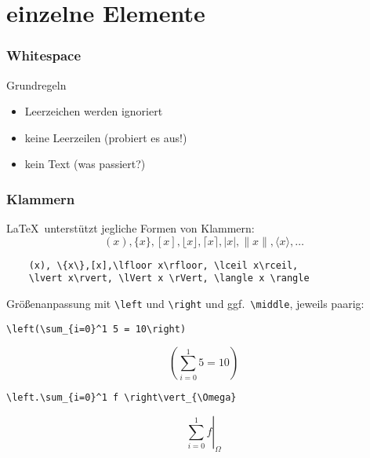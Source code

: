 \section{einzelne Elemente}

\begin{frame}[fragile]
  \frametitle {Whitespace}
  \begin{block}{Grundregeln}
    \begin{itemize}
      \item Leerzeichen werden ignoriert
      \item keine Leerzeilen (probiert es aus!)
      \item kein Text (was passiert?)
    \end{itemize}
  \end{block}
\end{frame}
% 

\begin{frame}[fragile]
  \frametitle{Klammern}

  \onslide<+->

  \LaTeX\ unterstützt jegliche Formen von Klammern:
  \begin{equation*}
    (x), \{x\},[x],\lfloor x\rfloor, \lceil x\rceil,\lvert x\rvert, \lVert x \rVert, \langle x \rangle, \ldots
  \end{equation*}

  \onslide<+->

  \begin{lstlisting}
    (x), \{x\},[x],\lfloor x\rfloor, \lceil x\rceil,
    \lvert x\rvert, \lVert x \rVert, \langle x \rangle

  \end{lstlisting}
    
  \medskip

  \onslide<+->

  Größenanpassung mit \lstinline{\left} und \lstinline{\right} und ggf.\ \lstinline|\middle|, jeweils paarig:

\begin{lstlisting}
\left(\sum_{i=0}^1 5 = 10\right)
\end{lstlisting}

  \vspace*{-2ex}

  \begin{equation*}
    \left(\sum_{i=0}^1 5 = 10\right)
  \end{equation*}


  \onslide<+->

\begin{lstlisting}
\left.\sum_{i=0}^1 f \right\vert_{\Omega}
\end{lstlisting}

  \vspace*{-2ex}

  \begin{equation*}
    \left.\sum_{i=0}^1 f \right\vert_{\Omega}
  \end{equation*}

\end{frame}

